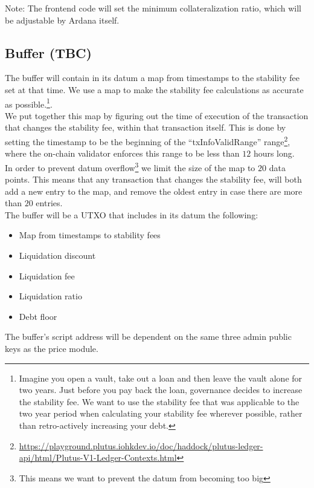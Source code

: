 \documentclass{article} %
\begin{document}
Note: The frontend code will set the minimum collateralization ratio, which will
be adjustable by Ardana itself.

\subsection{Buffer (TBC)}

The buffer will contain in its datum a map from timestamps to the stability fee
set at that time.
We use a map to make the stability fee calculations as accurate as
possible.\footnote{
  Imagine you open a vault, take out a loan and then leave the vault alone for
  two years.
  Just before you pay back the loan, governance decides to increase the
  stability fee.
  We want to use the stability fee that was applicable to the two year period
  when calculating your stability fee wherever possible, rather than
  retro-actively increasing your debt.
}. \\

We put together this map by figuring out the time of execution of the
transaction that changes the stability fee, within that transaction itself.
This is done by setting the timestamp to be the beginning of the
``txInfoValidRange'' range\footnote{
  \url{https://playground.plutus.iohkdev.io/doc/haddock/plutus-ledger-api/html/Plutus-V1-Ledger-Contexts.html}},
where the on-chain validator enforces this range to be less than $12$ hours
long. \\

In order to prevent datum overflow\footnote{
  This means we want to prevent the datum from becoming too big}
we limit the size of the map to $20$ data points.
This means that any transaction that changes the stability fee, will both add a
new entry to the map, and remove the oldest entry in case there are more than
$20$ entries. \\

The buffer will be a UTXO that includes in its datum the following:
\begin{itemize}
  \item Map from timestamps to stability fees
  \item Liquidation discount
  \item Liquidation fee
  \item Liquidation ratio
  \item Debt floor
\end{itemize}
The buffer's script address will be dependent on the same three admin public
keys as the price module. \\
\end{document}
